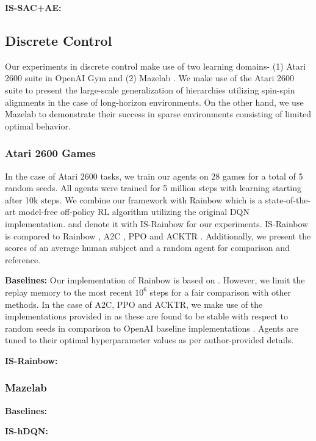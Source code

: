 \documentclass{article}
\begin{document}
\textbf{IS-SAC+AE:}

\subsection{Discrete Control}
Our experiments in discrete control make use of two learning domains- (1) Atari 2600 suite in OpenAI Gym \cite{gym} and (2) Mazelab \cite{mazelab}. We make use of the Atari 2600 suite to present the large-scale generalization of hierarchies utilizing spin-spin alignments in the case of long-horizon environments. On the other hand, we use Mazelab to demonstrate their success in sparse environments consisting of limited optimal behavior. 

\subsubsection{Atari 2600 Games}
In the case of Atari 2600 tasks, we train our agents on 28 games for a total of 5 random seeds. All agents were trained for 5 million steps with learning starting after 10k steps. We combine our framework with Rainbow \cite{rainbow} which is a state-of-the-art model-free off-policy RL algorithm utilizing the original DQN \cite{rainbow} implementation. and denote it with IS-Rainbow for our experiments. IS-Rainbow is compared to Rainbow \cite{rainbow}, A2C \cite{a2c}, PPO \cite{ppo} and ACKTR \cite{acktr}. Additionally, we present the scores of an average human subject and a random agent for comparison and reference.

\textbf{Baselines:} Our implementation of Rainbow is based on \cite{curl}. However, we limit the replay memory to the most recent $10^{6}$ steps for a fair comparison with other methods. In the case of A2C, PPO and ACKTR, we make use of the implementations provided in \cite{kostrikov} as these are found to be stable with respect to random seeds in comparison to OpenAI baseline implementations \cite{baselines}. Agents are tuned to their optimal hyperparameter values as per author-provided details.

\textbf{IS-Rainbow:}

\subsubsection{Mazelab}
\textbf{Baselines:}

\textbf{IS-hDQN:}
\end{document}
